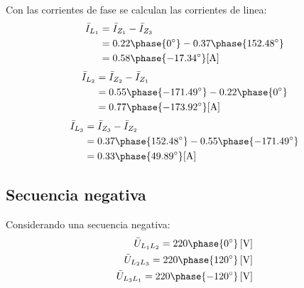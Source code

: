 \documentclass[letter,11pt]{article}
\begin{document}
Con las corrientes de fase se calculan las corrientes de linea:
\begin{equation*}
    \begin{split}
        \bar{I}_{L_1} &= \bar{I}_{Z_1}-\bar{I}_{Z_3}\\
                      &= 0.22\phase{0^{\circ}}-0.37\phase{152.48^{\circ}}\\
                      &= 0.58\phase{-17.34^{\circ}}[\text{A}]\\
    \end{split}
\end{equation*}
\begin{equation*}
    \begin{split}
        \bar{I}_{L_2} &= \bar{I}_{Z_2}-\bar{I}_{Z_1}\\
                      &= 0.55\phase{-171.49^{\circ}}-0.22\phase{0^{\circ}}\\
                      &= 0.77\phase{-173.92^{\circ}}[\text{A}]\\
    \end{split}
\end{equation*}
\begin{equation*}
    \begin{split}
        \bar{I}_{L_3} &= \bar{I}_{Z_3}-\bar{I}_{Z_2}\\
                      &= 0.37\phase{152.48^{\circ}}-
                         0.55\phase{-171.49^{\circ}}\\
                      &= 0.33\phase{49.89^{\circ}}[\text{A}]\\
    \end{split}
\end{equation*}

\subsection{Secuencia negativa}
Considerando una secuencia negativa:
\begin{equation*}
    \begin{split}
        \bar{U}_{L_1L_2} = 220\phase{0^{\circ}}\,[\text{V}]\\
        \bar{U}_{L_2L_3} = 220\phase{120^{\circ}}\,[\text{V}]\\
        \bar{U}_{L_3L_1} = 220\phase{-120^{\circ}}\,[\text{V}]\\
    \end{split}
\end{equation*}
\end{document}
